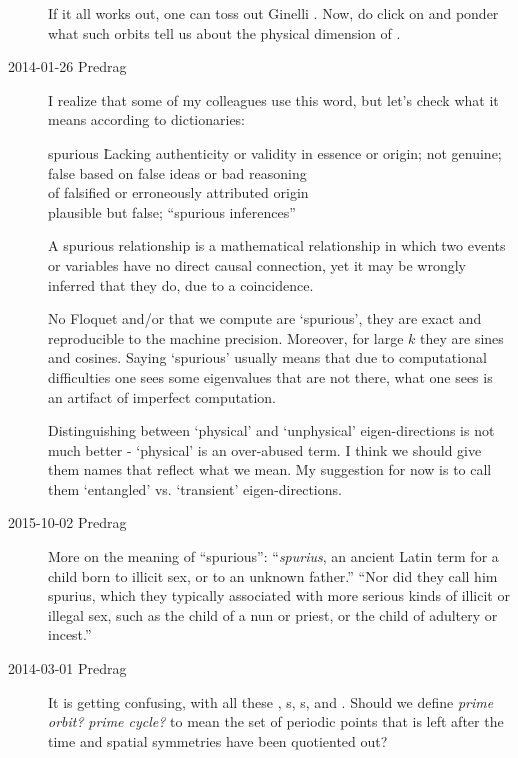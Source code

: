 \begin{description}
If it all works out, one can toss out Ginelli \etal. Now, do
click on
and ponder what such orbits tell us about the physical dimension of
\KS.

\item[2014-01-26 Predrag] I realize that some of my colleagues use this
    word, but let's check what it means according to dictionaries:
    \begin{tabbing}
     spurious \=  Lacking authenticity or validity in essence or origin; not genuine; false \kill
        \> based on false ideas or bad reasoning \\
        \> of falsified or erroneously attributed origin \\
        \> plausible but false; ``spurious inferences'' \\
    \end{tabbing}
A spurious relationship is a mathematical relationship in which two
        events or variables have no direct causal connection, yet it
        may be wrongly inferred that they do, due to a coincidence.

        No
        Floquet and/or {\cLvs} that we compute are
        `spurious',
they are exact and reproducible to the machine precision. Moreover, for
large $k$ they are sines and cosines. Saying `spurious' usually means that due to
computational difficulties one sees some eigenvalues that are not there, what one
sees is an artifact of imperfect computation.

Distinguishing between `physical' and `unphysical' eigen-directions is not much better -
`physical' is an over-abused term. I think we should give them names that reflect
what we mean. My suggestion for now is to call them
`entangled' vs. `transient' eigen-directions.

\item[2015-10-02 Predrag] More on the
     {meaning of ``spurious''}:
``\emph{spurius}, an ancient Latin term for a child born to illicit sex,
or to an unknown father.''
``Nor did they call him spurius, which they typically associated with
more serious kinds of illicit or illegal sex, such as the child of a nun
or priest, or the child of adultery or incest.''

\item[2014-03-01 Predrag]
\label{2014-03-01PC}
It is getting confusing, with all these \eqva, \po s, \rpo s, and \reqva.
Should we define {\em prime orbit?}
{\em prime cycle?} to mean the set of periodic points that is left
after the time and spatial symmetries have been quotiented out?



\end{description}
